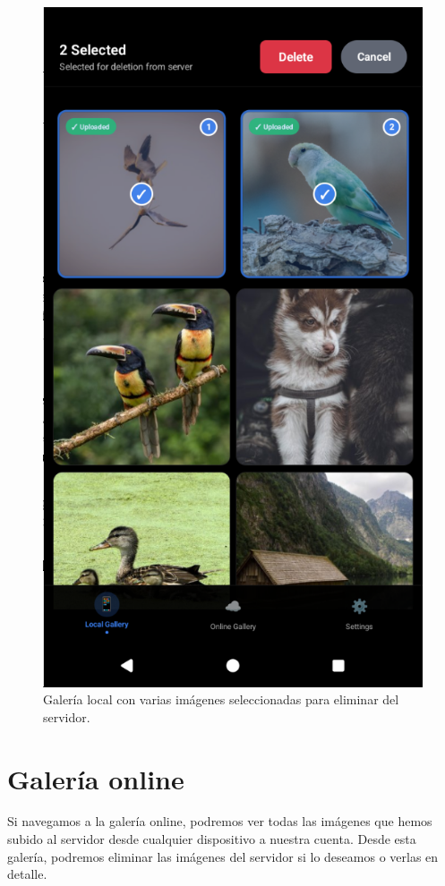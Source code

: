 \begin{figure}[H]
\begin{minipage}[t]{0.3\textwidth}
    \includegraphics[width=\textwidth]{assets/local-gallery-delete-selected.png}
    \caption{Galería local con varias imágenes seleccionadas para eliminar del servidor.}
    \label{fig:local-gallery-delete-selected}
  \end{minipage}
\end{figure}

\section{Galería online}
Si navegamos a la galería online, podremos ver todas las imágenes que hemos subido al servidor desde cualquier dispositivo a nuestra cuenta. Desde esta galería, podremos eliminar las imágenes del servidor si lo deseamos o verlas en detalle.


